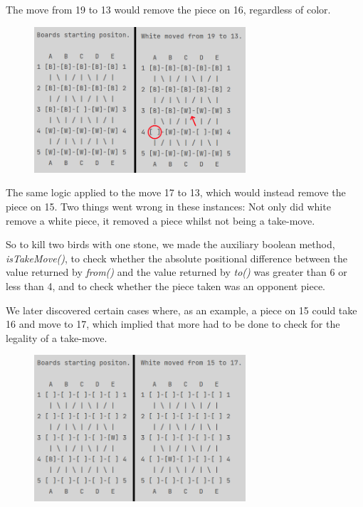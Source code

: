 \documentclass[12pt, a4paper]{article}
\begin{document}
The move from 19 to 13 would remove the piece on 16, regardless of color. \par

\begin{figure}[h]
	\centering
	\includegraphics[width=0.7\textwidth]{19til13TakeFejl.png}	
\end{figure}

The same logic applied to the move 17 to 13, which would instead remove the piece on 15. 
Two things went wrong in these instances: Not only did white remove a white piece, it removed a piece whilst not being a take-move. \par So to kill two birds with one stone, we made the auxiliary boolean method, \emph{isTakeMove()}, to check whether the absolute positional difference between the value returned by \emph{from()} and the value returned by \emph{to()} was greater than 6 or less than 4, and to check whether the piece taken was an opponent piece. \par 
We later discovered certain cases where, as an example, a piece on 15 could take 16 and move to 17, which implied that more had to be done to check for the legality of a take-move. \par

\begin{figure}[h]
	\centering
	\includegraphics[width=0.7\textwidth]{15til17TakeFejl.png}	
\end{figure}
\end{document}
